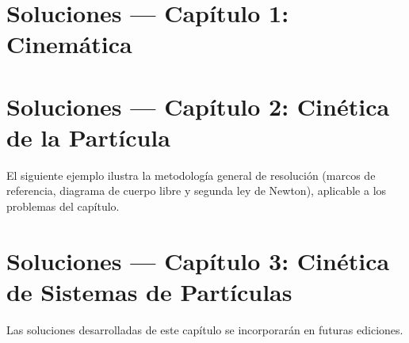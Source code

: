 
\section{Soluciones — Capítulo 1: Cinemática}


\clearpage

\clearpage

\section{Soluciones — Capítulo 2: Cinética de la Partícula}

El siguiente ejemplo ilustra la metodología general de resolución (marcos de referencia,
diagrama de cuerpo libre y segunda ley de Newton), aplicable a los problemas del capítulo.


\clearpage

\clearpage

\section{Soluciones — Capítulo 3: Cinética de Sistemas de Partículas}

Las soluciones desarrolladas de este capítulo se incorporarán en futuras ediciones.

